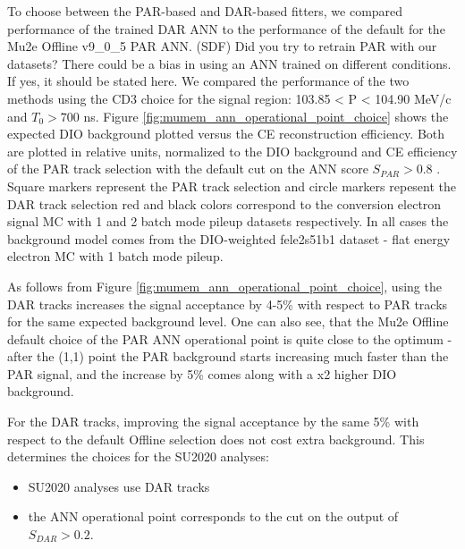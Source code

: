 To choose between the PAR-based and DAR-based fitters, we compared performance of the
trained DAR ANN to the performance of the default for the  {\blue Mu2e Offline} v9\_0\_5  PAR ANN.
{\blue (SDF) Did you try to retrain PAR with our datasets? There could be a bias in using an ANN trained on different conditions. If yes, it should be stated here.} 
%
{\blue We compared the performance of the two methods using the CD3 choice for the signal region: 103.85 < P < 104.90 MeV/c and $T_0 > 700$ ns.}
%
Figure \ref{fig:mumem_ann_operational_point_choice} shows the expected DIO background plotted
versus the CE reconstruction efficiency. Both are plotted in relative units, normalized
to the DIO background and CE efficiency of the PAR track selection with the default
cut on the ANN score $S_{PAR} > 0.8$ .
%
 {\blue Square markers} represent {\blue the} PAR track selection
{\blue and circle markers repesent the} DAR track selection\strike{,}{\blue ;} red and black colors
correspond to the  {\blue conversion electron signal MC with 1 and 2} batch mode pileup
 datasets  {\blue respectively}.
%
In all cases the background model comes from the DIO-weighted fele2s51b1 dataset -
 {\blue flat energy electron MC with} 1 batch {\blue mode} pileup. 

As follows from Figure \ref{fig:mumem_ann_operational_point_choice}, 
{\blue using the DAR tracks increases the signal acceptance by 4-5\% with respect to PAR tracks for the same expected  background level.}
One can also see, that the {\blue Mu2e Offline default} choice of the PAR ANN operational point is quite close to the optimum - after the 
(1,1) point the PAR background starts increasing much faster than the PAR signal,
and the increase by 5\% comes along with  {\blue a} x2 higher DIO background.

For the DAR tracks, improving the signal acceptance by the same 5\%  {\blue with respect to} the default 
{\blue Offline} selection  {\blue does not} cost extra background. This determines the choices for {\blue the} SU2020 analyses: 

\begin{itemize}
\item
  SU2020 analyses use DAR tracks
\item
  the ANN operational point corresponds to the cut on the output of $S_{DAR} > 0.2$.
\end{itemize}

